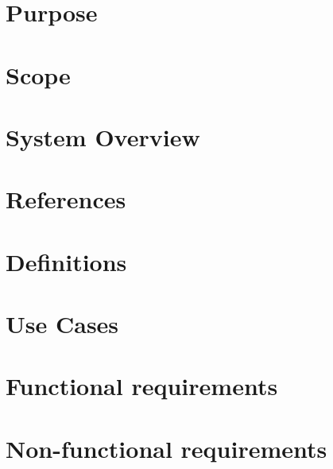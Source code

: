 
\section{Purpose}

\section{Scope}

\section{System Overview}

\section{References}

\section{Definitions}

\section{Use Cases}

\section{Functional requirements}

\section{Non-functional requirements}